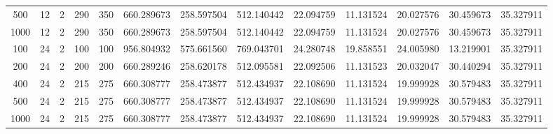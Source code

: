 \begin{table}[h]
\begin{tabular}{ccccccccccccc}
500 & 12 & 2 & 290 & 350 & 660.289673 & 258.597504 & 512.140442 & 22.094759 & 11.131524 & 20.027576 & 30.459673 & 35.327911 \\
1000 & 12 & 2 & 290 & 350 & 660.289673 & 258.597504 & 512.140442 & 22.094759 & 11.131524 & 20.027576 & 30.459673 & 35.327911 \\
100 & 24 & 2 & 100 & 100 & 956.804932 & 575.661560 & 769.043701 & 24.280748 & 19.858551 & 24.005980 & 13.219901 & 35.327911 \\
200 & 24 & 2 & 200 & 200 & 660.289246 & 258.620178 & 512.095581 & 22.092506 & 11.131523 & 20.032047 & 30.440294 & 35.327911 \\
400 & 24 & 2 & 215 & 275 & 660.308777 & 258.473877 & 512.434937 & 22.108690 & 11.131524 & 19.999928 & 30.579483 & 35.327911 \\
500 & 24 & 2 & 215 & 275 & 660.308777 & 258.473877 & 512.434937 & 22.108690 & 11.131524 & 19.999928 & 30.579483 & 35.327911 \\
1000 & 24 & 2 & 215 & 275 & 660.308777 & 258.473877 & 512.434937 & 22.108690 & 11.131524 & 19.999928 & 30.579483 & 35.327911 \\
\bottomrule
\end{tabular}
\end{table}
